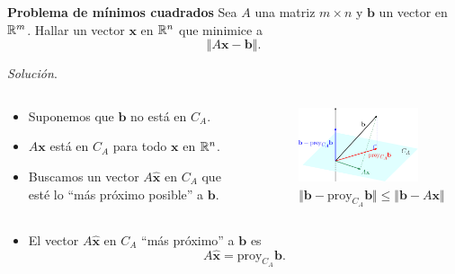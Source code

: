 \begin{frame}%
	
	\begin{ejem}{\textbf{Problema de mínimos cuadrados}}
		\justifying
		Sea $A$ una matriz $m\times n$ y $\mathbf{b}$ un vector en $\mathbb{R}^m$. Hallar un vector $\mathbf{x}$ en $\mathbb{R}^n$
		que minimice a
		\begin{equation}\tag{1}
		\left\Vert A\mathbf{x} - \mathbf{b} \right\Vert. 
		\end{equation}					
	\end{ejem}
	\textit{Solución}.
	
	\vspace{-3mm}
	\begin{columns}
		\begin{column}{0.55\textwidth}
			\begin{itemize}		
				\item Suponemos que $\mathbf{b}$ no está en $C_A$.
				
				\vspace{2mm}
				\item $A\mathbf{x}$ está en $C_A$ para todo $\mathbf{x}$ en $\mathbb{R}^n$.
				
				\vspace{2mm}
				\item Buscamos un vector $A\mathbf{\widehat{x}}$ en $C_A$ que esté lo ``más próximo posible'' a $\mathbf{b}$.
			\end{itemize}
		\end{column}
		\begin{column}{0.35\textwidth}  %
			
			\vspace{-2mm}
			\begin{figure}
				\centering
				\includegraphics[width=3.5cm]{imagenes/minimos.eps}
				{\scriptsize  $\Vert \mathbf{b}-\text{proy}_{C_A}\mathbf{b}  \Vert \leq \Vert \mathbf{b} - A\mathbf{x}\Vert $}
			\end{figure}
		\end{column}
	\end{columns}
	
	\vspace{0mm}
	\begin{itemize}		
		\item El vector $A\mathbf{\widehat{x}}$ en $C_A$ ``más próximo'' a $\mathbf{b}$ es		
		\[
			A\mathbf{\widehat{x}} = \text{proy}_{C_A} \mathbf{b}.
		\]


\end{itemize}
\end{frame}
